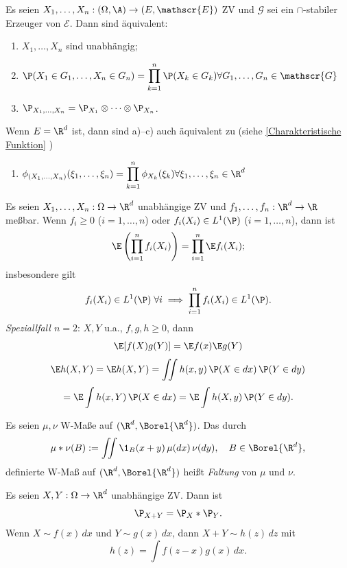 \documentclass[11pt, a4paper]{article}
\begin{document}
\begin{theorem}\Theorem
    Es seien $X_1, \ldots, X_n: (\Omega, \A) \to (E, \mathscr{E})$ ZV und $\mathscr{G}$ sei ein $\cap$-stabiler Erzeuger von $\mathscr{E}$. Dann sind äquivalent:
    \begin{enumerate}[label=\alph*)]
        \item $X_1, \ldots, X_n$ sind unabhängig;
        \item $\P(X_1 \in G_1, \ldots, X_n \in G_n) = \displaystyle\prod_{k=1}^n \P(X_k \in G_k) \hfill \forall G_1, \ldots, G_n \in \mathscr{G}$
        \item $\P_{X_1,\ldots,X_n} = \P_{X_1} \otimes \cdots \otimes \P_{X_n}$.
    \end{enumerate}
    Wenn $E = \R^d$ ist, dann sind a)--c) auch äquivalent zu (siehe \ref{Charakteristische Funktion} )
    \begin{enumerate}[label=\alph*), start=4]
        \item $\displaystyle\phi_{(X_1,\dots,X_n)}(\xi_1,\dots, \xi_n) = \prod_{k=1}^n \phi_{X_k}(\xi_k) \hfill \forall \xi_1,\dots , \xi_n \in \R^d$
    \end{enumerate}
\end{theorem}


\begin{corollary}
    Es seien $X_1, \dots, X_n: \Omega \to \R^d$ unabhängige ZV und $f_1, \dots, f_n: \R^d \to \R$ meßbar. Wenn $f_i \ge 0$ ($i = 1, \dots, n$) oder $f_i(X_i) \in L^1(\P)$ ($i = 1, \dots, n$), dann ist
    $$\E\left(\prod_{i=1}^n f_i(X_i)\right) = \prod_{i=1}^n \E f_i(X_i);$$
    insbesondere gilt
    $$f_i(X_i) \in L^1(\P) \; \forall i \;\Longrightarrow\; \prod_{i=1}^n f_i(X_i) \in L^1(\P).$$
    \emph{Speziallfall $n=2$}: $X, Y$ u.a., $f,g, h\geq 0$, dann
    $$\E [f(X)g(Y)] = \E f(x) \E g(Y)$$
    $$\E h(X,Y) = \E h(X,Y) = \iint h(x,y) \, \P(X \in dx) \, \P(Y \in dy) $$$$= \E \int h(x, Y) \, \P(X \in dx) = \E \int h(X, y) \, \P(Y \in dy).$$
\end{corollary}

\begin{definition}[Faltung] \Theorem
    Es seien $\mu, \nu$ W-Maße auf $(\R^d, \Borel{\R^d})$. Das durch
    $$\mu \ast \nu(B) := \iint \1_B(x+y) \, \mu(dx) \, \nu(dy), \quad B \in \Borel{\R^d},$$
    definierte W-Maß auf $(\R^d, \Borel{\R^d})$ heißt \emph{Faltung} von $\mu$ und $\nu$.
\end{definition}

\begin{theorem}
    Es seien $X, Y: \Omega \to \R^d$ unabhängige ZV. Dann ist
    $$\P_{X+Y} = \P_X \ast \P_Y.$$
    Wenn $X \sim f(x)\,dx$ und $Y \sim g(x)\,dx$, dann $X + Y \sim h(z)\,dz$ mit
    $$h(z) = \int f(z-x) g(x) \, dx.$$
\end{theorem}
\end{document}
